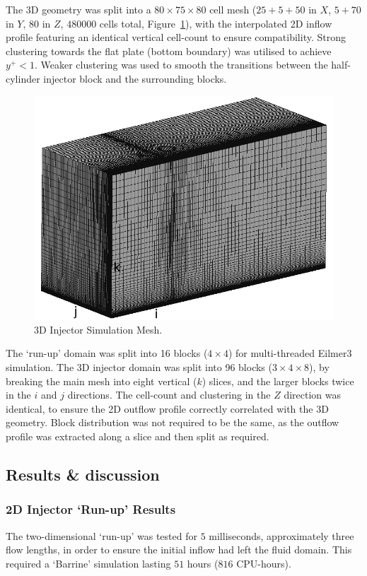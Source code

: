 The 3D geometry was split into a $80\times75\times80$ cell mesh ($25+5+50$ in $X$, $5+70$ in $Y$, $80$ in $Z$, $480000$ cells total, Figure~\ref{f:tc3:mesh}), with the interpolated 2D inflow profile featuring an identical vertical cell-count to ensure compatibility. Strong clustering towards the flat plate (bottom boundary) was utilised to achieve $y^+<1$. Weaker clustering was used to smooth the transitions between the half-cylinder injector block and the surrounding blocks.
%
\begin{figure}[htbp]
 \begin{center}
  \includegraphics[width=12cm]{./chap8-3Dinjector/figs/inject-mesh.png}
  \caption{3D Injector Simulation Mesh.}
  \label{f:tc3:mesh}
 \end{center}
\end{figure}
%

The `run-up' domain was split into 16 blocks ($4\times4$) for multi-threaded Eilmer3 simulation. The 3D injector domain was split into 96 blocks ($3\times4\times8$), by breaking the main mesh into eight vertical ($k$) slices, and the larger blocks twice in the $i$ and $j$ directions. The cell-count and clustering in the $Z$ direction was identical, to ensure the 2D outflow profile correctly correlated with the 3D geometry. Block distribution was not required to be the same, as the outflow profile was extracted along a slice and then split as required.

\subsection{Results \& discussion}
%
\subsubsection{2D Injector `Run-up' Results}
%
The two-dimensional `run-up' was tested for $5$ milliseconds, approximately three flow lengths, in order to ensure the initial inflow had left the fluid domain. This required a `Barrine' simulation lasting $51$ hours ($816$ CPU-hours). 

